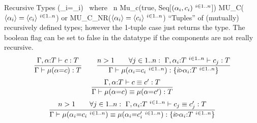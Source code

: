 \documentclass[12pt,twoside,fleqn]{article}
\begin{document}
  {Recursive Types}
  {\mu(\cvar_i{=}\constructor_i)\quad
     \mbox{\ where\ } n}
  {Mu\_c(true, Seq[$(\alpha_i,c_i)\ {}^{i\in 1..n}$])}
  {MU\_C($\langle{\alpha_i}\rangle = \langle{c_i}\rangle\ {}^{i\in 1..n}$) \mbox{or} 
   MU\_C\_NR($\langle{\alpha_i}\rangle = \langle{c_i}\rangle\ {}^{i\in 1..n}$)}
  {``Tuples'' of (mutually) recursively defined types; however the
   1-tuple case just returns the type.
   The boolean flag can be set to false in the datatype if the components
   are not really recursive.}
  {\[\frac{
       \Gamma,\alpha{:}T\vdash c : T}
    {\Gamma\vdash \mu(\alpha{=}c) : T}
   \qquad
   \frac{n>1\qquad
       \forall j\in1..n:\
       \Gamma,\alpha_i{:}T\ {}^{i\in 1..n}\vdash c_j : T}
    {\Gamma\vdash \mu(\alpha_i{=}c_i\ {}^{i\in 1..n}) : \{{i{\triangleright}\alpha_i{:}T\ {}^{i\in 1..n}}\}}
   \]
   \[\frac{
       \Gamma,\alpha{:}T\vdash c \equiv c' : T}
    {\Gamma\vdash \mu(\alpha{=}c) \equiv \mu(\alpha{=}c') : T}
   \]
   \[
   \frac{n>1\qquad
       \forall j\in1..n:\
       \Gamma,\alpha_i{:}T\ {}^{i\in 1..n}\vdash c_j \equiv c'_j : T}
    {\Gamma\vdash \mu(\alpha_i{=}c_i\ {}^{i\in 1..n}) \equiv \mu(\alpha_i{=}c'_i\ {}^{i\in 1..n}) : \{{i{\triangleright}\alpha_i{:}T\ {}^{i\in 1..n}}\}}
   \]
  }
\end{document}
